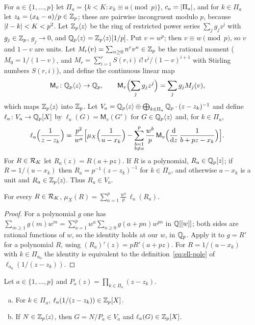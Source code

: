 For $a\in\{1,\dots,p\}$ let $\Pi_a=\{k<K:x_k\equiv a\pmod p\}$, $c_a=\left\lvert \Pi_a\right\rvert$, and for
$k\in\Pi_a$ let $z_k=(x_k-a)/p\in\mathbb{Z}_p$; these are pairwise incongruent modulo $p$, because
$\left\lvert l-k\right\rvert<K<p^2$. Let $\mathbb{Z}_p\langle z\rangle$ be the ring of restricted power series
$\sum_jg_jz^j$ with $g_j\in\mathbb{Z}_p$, $g_j\to0$, and $\mathbb{Q}_p\langle z\rangle=\mathbb{Z}_p\langle z\rangle[1/p]$. Put $v=w^p$;
then $v\equiv w\pmod p$, so $v$ and $1-v$ are units. Let $M_r(v)=\sum_{n\ge0}n^rv^n\in\mathbb{Z}_p$ be
the rational moment ($M_0=1/(1-v)$, and $M_r=\sum_{i=1}^r S(r,i)\,i!\,v^i/(1-v)^{i+1}$ with
Stirling numbers $S(r,i)$), and define the continuous linear map
\[
  \mathsf M_v\colon\mathbb{Q}_p\langle z\rangle\to\mathbb{Q}_p,\qquad \mathsf M_v\Bigl(\sum_jg_jz^j\Bigr)=\sum_jg_jM_j(v),
\]
which maps $\mathbb{Z}_p\langle z\rangle$ into $\mathbb{Z}_p$. Let $V_a=\mathbb{Q}_p\langle z\rangle\oplus\bigoplus_{k\in\Pi_a}\mathbb{Q}_p\cdot
(z-z_k)^{-1}$ and define $\ell_a\colon V_a\to\mathbb{Q}_p[X]$ by $\ell_a(G)=\mathsf M_v(G')$ for
$G\in\mathbb{Q}_p\langle z\rangle$ and, for $k\in\Pi_a$,
\begin{equation}\label{eq:ell-pole}
  \ell_a\Bigl(\frac1{z-z_k}\Bigr)=\frac{p^2}{w^a}\Bigl[\mu_X\Bigl(\frac1{u-x_k}\Bigr)
  -\sum_{\substack{b=1\\b\ne a}}^{p}\frac{w^b}{p}\,
  \mathsf M_v\Bigl(\frac{\mathrm d}{\mathrm dz}\,\frac{1}{b+pz-x_k}\Bigr)\Bigr].
\end{equation}
For $R\in\mathcal{R}_K$ let $R_a(z)=R(a+pz)$. If $R$ is a polynomial, $R_a\in\mathbb{Q}_p[z]$; if
$R=1/(u-x_k)$ then $R_a=p^{-1}(z-z_k)^{-1}$ for $k\in\Pi_a$, and otherwise $a-x_k$ is a unit and
$R_a\in\mathbb{Z}_p\langle z\rangle$. Thus $R_a\in V_a$.

\begin{lemma}\label{lem:distribution}
For every $R\in\mathcal{R}_K$, $\displaystyle\mu_X(R)=\sum_{a=1}^{p}\frac{w^a}{p}\,\ell_a(R_a)$.
\end{lemma}

\begin{proof}
For a polynomial $g$ one has $\sum_{m\ge1}g(m)w^m=\sum_{a=1}^pw^a\sum_{n\ge0}g(a+pn)w^{pn}$ in
$\mathbb{Q}[[w]]$; both sides are rational functions of $w$, so the identity holds at our $w$, in
$\mathbb{Q}_p$. Apply it to $g=R'$ for a polynomial $R$, using $(R_a)'(z)=pR'(a+pz)$. For
$R=1/(u-x_k)$ with $k\in\Pi_{a_0}$ the identity is equivalent to the definition~\eqref{eq:ell-pole}
of $\ell_{a_0}(1/(z-z_k))$.
\end{proof}

\begin{lemma}[integrality]\label{lem:local-integrality}
Let $a\in\{1,\dots,p\}$ and $P_a(z)=\prod_{k\in\Pi_a}(z-z_k)$.
\begin{enumerate}[(a)]
\item For $k\in\Pi_a$, $\ell_a(1/(z-z_k))\in\mathbb{Z}_p[X]$.
\item If $N\in\mathbb{Z}_p\langle z\rangle$, then $G=N/P_a\in V_a$ and $\ell_a(G)\in\mathbb{Z}_p[X]$.
\end{enumerate}
\end{lemma}

